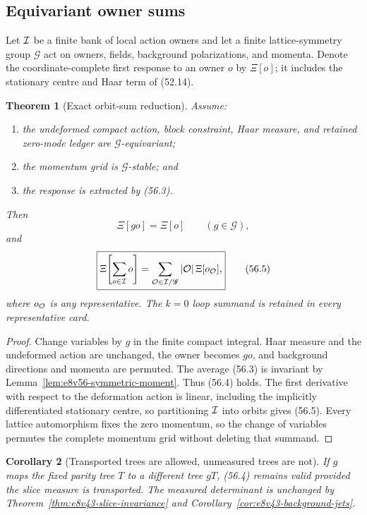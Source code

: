 \documentclass[11pt,oneside]{book}
\newtheorem{theorem}{Theorem}[chapter]
\newtheorem{corollary}[theorem]{Corollary}
\theoremstyle{definition}
\theoremstyle{remark}
\begin{document}
\subsection{Equivariant owner sums}

Let \({\cal I}\) be a finite bank of local action owners and let a
finite lattice-symmetry group \({\mathscr G}\) act on owners,
fields, background polarizations, and momenta.  Denote the
coordinate-complete first response to an owner \(o\) by
\(\Xi[o]\); it includes the stationary centre and Haar term of
(52.14).

\begin{theorem}[Exact orbit-sum reduction]
\label{thm:e8v56-orbit-sum}
Assume:
\begin{enumerate}
\item the undeformed compact action, block constraint, Haar
      measure, and retained zero-mode ledger are
      \({\mathscr G}\)-equivariant;
\item the momentum grid is \({\mathscr G}\)-stable; and
\item the response is extracted by (56.3).
\end{enumerate}
Then
\[
 \Xi[g o]=\Xi[o]\qquad(g\in{\mathscr G}),                     \tag{56.4}
\]
and
\[
 \boxed{
 \Xi\!\left[\sum_{o\in{\cal I}}o\right]
 =\sum_{{\cal O}\in{\cal I}/{\mathscr G}}
 |{\cal O}|\,\Xi[o_{\cal O}],}                               \tag{56.5}
\]
where \(o_{\cal O}\) is any representative.  The \(k=0\) loop
summand is retained in every representative card.
\end{theorem}

\begin{proof}
Change variables by \(g\) in the finite compact integral.  Haar
measure and the undeformed action are unchanged, the owner becomes
\(go\), and background directions and momenta are permuted.
The average (56.3) is invariant by
Lemma~\ref{lem:e8v56-symmetric-moment}.  Thus (56.4) holds.
The first derivative with respect to the deformation action is
linear, including the implicitly differentiated stationary centre,
so partitioning \({\cal I}\) into orbits gives (56.5).
Every lattice automorphism fixes the zero momentum, so the change
of variables permutes the complete momentum grid without deleting
that summand.
\end{proof}

\begin{corollary}[Transported trees are allowed, unmeasured trees
are not]
\label{cor:e8v56-transported-tree}
If \(g\) maps the fixed parity tree \(T\) to a different tree
\(gT\), (56.4) remains valid provided the slice measure is
transported.  The measured determinant is unchanged by
Theorem~\ref{thm:e8v43-slice-invariance} and
Corollary~\ref{cor:e8v43-background-jets}.
\end{corollary}
\end{document}
